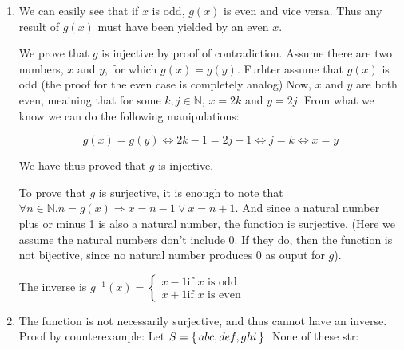 \documentclass{article}
\begin{document}
\begin{enumerate}
\begin{enumerate}
                \item We can easily see that if $x$ is odd, $g(x)$ is even and vice versa. Thus any result of $g(x)$ must have been yielded by an even $x$.

                    We prove that $g$ is injective by proof of contradiction. Assume there are two numbers, $x$ and $y$, for which $g(x) = g(y)$. Furhter assume that $g(x)$ is odd (the proof for the even case is completely analog) Now, $x$ and $y$ are both even, meaining that for some $k,j \in \mathbb{N}$, $x=2k$ and $y=2j$. From what we know we can do the following manipulations:

                    $$g(x) = g(y) \Leftrightarrow 2k-1 = 2j-1 \Leftrightarrow j = k \Leftrightarrow x = y$$

                    We have thus proved that $g$ is injective.

                    To prove that $g$ is surjective, it is enough to note that $\forall n \in \mathbb{N} . n = g(x) \Rightarrow x = n - 1 \lor x = n + 1$. And since a natural number plus or minus 1 is also a natural number, the function is surjective. (Here we assume the natural numbers don't include 0. If they do, then the function is not bijective, since no natural number produces 0 as ouput for $g$).

                The inverse is $g^{-1}(x) = \begin{cases} x - 1 \text{if } x \text{ is odd }\\ x + 1 \text{if } x \text{ is even } \end{cases}$


                \item The function is not necessarily surjective, and thus cannot have an inverse. Proof by counterexample: Let $S = \set{abc, def, ghi}$. None of these str:
        \end{enumerate}


\end{enumerate}
\end{document}
